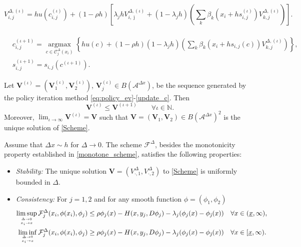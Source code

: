 \documentclass[10pt,a4paper]{amsart}
\def\bV{{\mathbf{V}}}
\def\i{{(\iota)}}
\newcommand{\Dx}{{\Delta x}}
\newcommand{\D}{\Delta}
\newcommand{\N}{\mathbb{N}}
\newcommand{\mA}{\mathcal A}
\newcommand{\mC}{\mathcal C}
\newcommand{\ux}{{\underline x}}
\begin{document}
\begin{equation}\label{eq:policy_ev}
     V_{i,j}^{\Delta, \i} = hu(c_{i,j}^{\i})+(1-\rho h)\left[\lambda_jhV_{i,\bar{\jmath}}^{\Delta,\i}+(1-\lambda_jh)\left(\sum_k\beta_k\left(x_i+hs^\i_{i,j}\right)V_{k,j}^{\Delta,\i}\right)\right].
\end{equation}\\

\begin{equation}\label{update_c}
\begin{aligned}
        &c^{(\iota+1)}_{i,j}=\mathop{\arg\max}\limits_{c\in \mC^{\D}_{j}(x_i)}\left\{
		hu(c)+(1-\rho h)(1-\lambda_jh)\left(\sum_k \beta_k(x_i+hs_{i,j}(c))V^{\D,\i}_{k,j}\right)\right\},\\
&s^{(\iota+1)}_{i,j}=s_{i,j}(c^{(\iota+1)}).		
\end{aligned}
\end{equation}

\begin{theorem}\label{Howard theo}
	Let $\bV^\i=(\bV^\i_1, \bV^\i_2)$, $\bV^\i_j\in  B(\mA^\Dx)$, be the sequence generated by the policy iteration method \eqref{eq:policy_ev}-\eqref{update_c}. Then
	\begin{equation}\label{eq:est_PI}
		\bV^\i \le \bV^{(\iota+1)} \qquad \forall \iota \in \N.
	\end{equation}
Moreover, $\lim_{\iota \to \infty}\bV^\i=\bV$ such that $\bV=(\bV_1,\bV_2)\in B(\mA^\Dx)^2$ is the unique solution of \cref{Scheme}.
\end{theorem}

\begin{proposition}\label{prop_scheme}
Assume that $\D x\sim h$ for $\D\to 0$. The scheme $\mathcal{F}^\D$, besides the monotonicity property established in \cref{monotone_scheme}, satisfies the following properties:
\begin{itemize}
\item[]{\em  Stability: } The unique  solution $\bV=(V^\D_{\cdot,1},V^\D_{\cdot,2})$ to \cref{Scheme} is uniformly bounded in $\D$.
	
	\item[]{\em  Consistency: } For $j=1,2$ and for any
	smooth function $\phi=(\phi_1,\phi_2)$
	\begin{align*}
			\limsup_{{\D\to 0}\atop{x_i\to x} } \mathcal{F}^\D_j(x_i,\phi(x_i),\phi_{j})  & \leq  \rho \phi_{j}(x)- H(x,y_j,D\phi_{j})-\lambda_j(\phi_{j}(x)-\phi_{\bar \jmath}(x))
		 \quad \forall x\in(\ux,\infty),\\
		\liminf_{{\D\to 0}\atop{x_i\to x}} \mathcal{F}^\D_j(x_i,\phi(x_i),\phi_{j})    &\geq \rho \phi_{j}(x)- H(x,y_j,D\phi_{j})-\lambda_j(\phi_{j}(x)-\phi_{\bar \jmath}(x)) 
	    \quad \forall x\in[\ux,\infty).
	\end{align*}
	\end{itemize}
\end{proposition}
\end{document}

